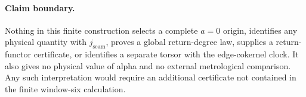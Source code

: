 \paragraph{Claim boundary.}
Nothing in this finite construction selects a complete $a=0$ origin, identifies any physical quantity with $j_{\mathrm{seam}}$, proves a global return-degree law, supplies a return-functor certificate, or identifies a separate torsor with the edge-cokernel clock.  It also gives no physical value of alpha and no external metrological comparison.  Any such interpretation would require an additional certificate not contained in the finite window-six calculation.
